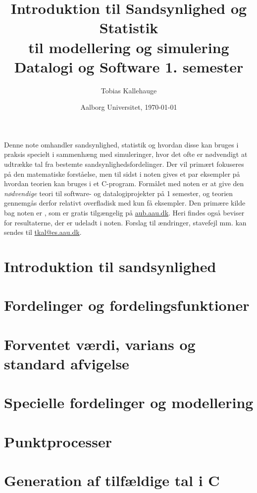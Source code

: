 \documentclass{article}
\title{Introduktion til Sandsynlighed og Statistik \\
til modellering og simulering  \\
\large Datalogi og Software 1. semester}
\date{Aalborg Universitet, \today}
\author{Tobias Kallehauge}
\begin{document}
\maketitle
\newpage
Denne note omhandler sandsynlighed, statistik og hvordan disse kan bruges i praksis specielt i sammenhæng med simuleringer, hvor det ofte er nødvendigt at udtrække tal fra bestemte sandsynlighedsfordelinger. Der vil primært fokuseres på den matematiske forståelse, men til sidst i noten gives et par eksempler på hvordan teorien kan bruges i et C-program. Formålet med noten er at give den \emph{nødvendige} teori til software- og datalogiprojekter på  1 semester, og teorien gennemgås derfor relativt overfladisk med kun få eksempler. Den primære kilde bag noten er \cite{olofsson2012}, som er gratis tilgængelig på \href{aub.aau.dk}{aub.aau.dk}. Heri findes også beviser for resultaterne, der er udeladt i noten. Forslag til ændringer, stavefejl mm. kan sendes til \href{mailto:tkal@es.aau.dk}{tkal@es.aau.dk}. 
\section{Introduktion til sandsynlighed}


\section{Fordelinger og fordelingsfunktioner}


\section{Forventet værdi, varians og standard afvigelse}

\section{Specielle fordelinger og modellering}

\section{Punktprocesser}


\section{Generation af tilfældige tal i C}




\printbibliography[heading=bibintoc]
\label{bib:mybiblio}
\end{document}

